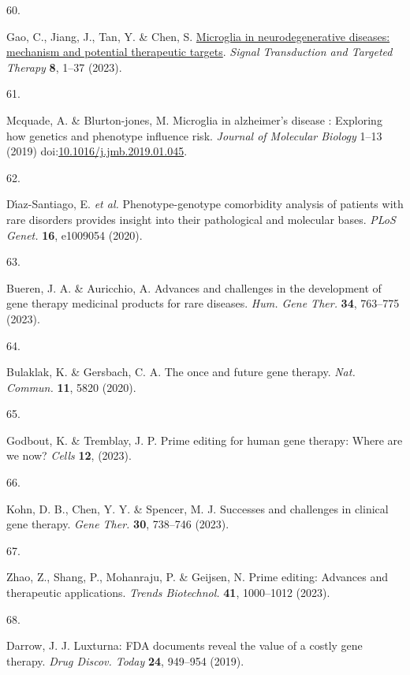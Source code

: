 \documentclass[
]{agujournal2019}
\newlength{\cslhangindent}
\newlength{\csllabelwidth}
\newenvironment{CSLReferences}[2] %
 {\begin{list}{}{%
  \setlength{\itemindent}{0pt}
  \setlength{\leftmargin}{0pt}
  \setlength{\parsep}{0pt}
  \ifodd #1
   \setlength{\leftmargin}{\cslhangindent}
   \setlength{\itemindent}{-1\cslhangindent}
  \fi
  \setlength{\itemsep}{#2\baselineskip}}}
 {\end{list}}
\newcommand{\CSLLeftMargin}[1]{\parbox[t]{\csllabelwidth}{\strut#1\strut}}
\newcommand{\CSLRightInline}[1]{\parbox[t]{\linewidth - \csllabelwidth}{\strut#1\strut}}
\begin{document}
\begin{CSLReferences}{0}{0}
\CSLLeftMargin{60. }%
\CSLRightInline{Gao, C., Jiang, J., Tan, Y. \& Chen, S.
\href{https://doi.org/10.1038/s41392-023-01588-0}{Microglia in
neurodegenerative diseases: mechanism and potential therapeutic
targets}. \emph{Signal Transduction and Targeted Therapy} \textbf{8},
1--37 (2023).}

\CSLLeftMargin{61. }%
\CSLRightInline{Mcquade, A. \& Blurton-jones, M. Microglia in
alzheimer's disease : Exploring how genetics and phenotype influence
risk. \emph{Journal of Molecular Biology} 1--13 (2019)
doi:\href{https://doi.org/10.1016/j.jmb.2019.01.045}{10.1016/j.jmb.2019.01.045}.}

\CSLLeftMargin{62. }%
\CSLRightInline{Dı́az-Santiago, E. \emph{et al.} Phenotype-genotype
comorbidity analysis of patients with rare disorders provides insight
into their pathological and molecular bases. \emph{PLoS Genet.}
\textbf{16}, e1009054 (2020).}

\CSLLeftMargin{63. }%
\CSLRightInline{Bueren, J. A. \& Auricchio, A. Advances and challenges
in the development of gene therapy medicinal products for rare diseases.
\emph{Hum. Gene Ther.} \textbf{34}, 763--775 (2023).}

\CSLLeftMargin{64. }%
\CSLRightInline{Bulaklak, K. \& Gersbach, C. A. The once and future gene
therapy. \emph{Nat. Commun.} \textbf{11}, 5820 (2020).}

\CSLLeftMargin{65. }%
\CSLRightInline{Godbout, K. \& Tremblay, J. P. Prime editing for human
gene therapy: Where are we now? \emph{Cells} \textbf{12}, (2023).}

\CSLLeftMargin{66. }%
\CSLRightInline{Kohn, D. B., Chen, Y. Y. \& Spencer, M. J. Successes and
challenges in clinical gene therapy. \emph{Gene Ther.} \textbf{30},
738--746 (2023).}

\CSLLeftMargin{67. }%
\CSLRightInline{Zhao, Z., Shang, P., Mohanraju, P. \& Geijsen, N. Prime
editing: Advances and therapeutic applications. \emph{Trends
Biotechnol.} \textbf{41}, 1000--1012 (2023).}

\CSLLeftMargin{68. }%
\CSLRightInline{Darrow, J. J. Luxturna: {FDA} documents reveal the value
of a costly gene therapy. \emph{Drug Discov. Today} \textbf{24},
949--954 (2019).}


\end{CSLReferences}
\end{document}
